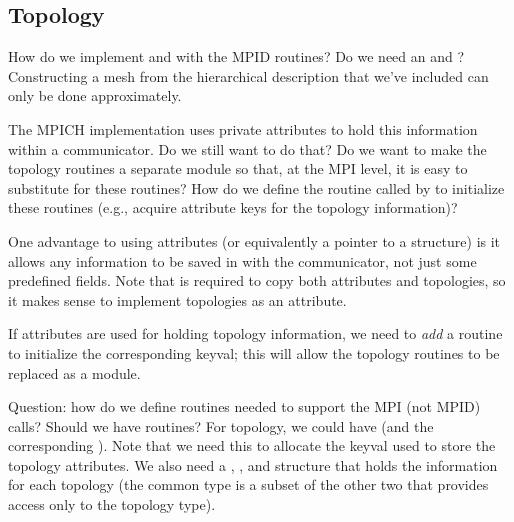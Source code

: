 \documentclass{article}
\begin{document}

\subsection{Topology}
\label{sec:topo}

How do we implement  and 
with the MPID routines?   
Do we need an  and
?  Constructing a mesh from the 
hierarchical description that we've included can only be done
approximately.

The MPICH implementation uses private attributes to hold this information 
within a communicator.  Do we still want to do that?  Do we want to make the
topology routines a separate module so that, at the MPI level, it is easy to
substitute for these routines?  How do we define the routine called by
 to initialize these routines (e.g., acquire attribute keys
for the topology information)?

One advantage to using attributes (or equivalently a pointer to a
structure) is it allows any information to be saved in with the
communicator, not just some predefined fields.  Note that
 is required to copy both attributes and
topologies, so it makes sense to implement topologies as an attribute.

If attributes are used for holding topology information, we need to
\emph{add} a routine to initialize the corresponding keyval; this will
allow the topology routines to be replaced as a module.

Question: how do we define routines needed to support the MPI (not
MPID) calls?  Should we have  routines?  For topology, we
could have  (and the corresponding
).   Note that we need this to allocate the
keyval used to store the topology attributes.  We also need a
, , and
 structure that holds the information for each
topology (the common type is a subset of the other two that provides access
only to the topology type).
\end{document}
